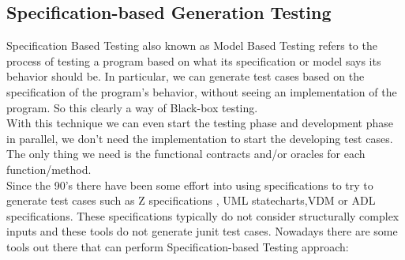 \documentclass[10pt, conference, compsocconf]{IEEEtran}
\begin{document}
\subsection{Specification-based Generation Testing}
Specification Based Testing also known as Model Based Testing refers to the process of testing a program based on what its specification or model says its behavior should be.
In particular, we can generate test cases based on the specification of the program's behavior, without seeing an implementation of the program. So this clearly a
way of Black-box testing.\\
With this technique we can even start the testing phase and development phase in parallel, we don't need the implementation
to start the developing test cases. The only thing we need is the functional contracts and/or oracles for each function/method.\\
Since the 90's there have been some effort into using specifications to try to generate test cases such as Z specifications
\cite{Horcher95improvingsoftware,Stocks:1996:FST:239916.239918}, UML statecharts\cite{Offutt:1999:GTU:1767297.1767341},VDM\cite{Aichernig99automatedblack-box}
or ADL specifications\cite{Sankar94specifyingand}.
These specifications typically do not consider structurally complex inputs and these tools do not generate junit test cases.
Nowadays there are some tools out there that can perform Specification-based Testing approach:
\end{document}
